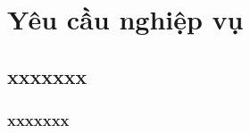 \documentclass{article}
\begin{document}
% 

% 

% 

% 


% 

\section{Yêu cầu nghiệp vụ}


\subsection{xxxxxxx}
\subsubsection{xxxxxxx}


\end{document}
